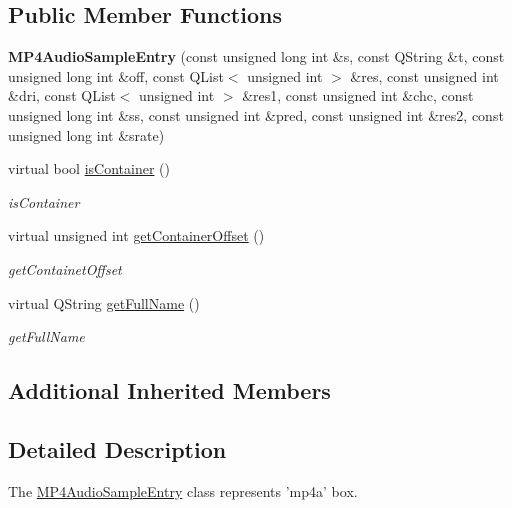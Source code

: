 \subsection*{Public Member Functions}
\begin{DoxyCompactItemize}
\item 
\hypertarget{class_m_p4_audio_sample_entry_a744193cef07d69037cd0b0ed7eb7feea}{{\bfseries M\-P4\-Audio\-Sample\-Entry} (const unsigned long int \&s, const Q\-String \&t, const unsigned long int \&off, const Q\-List$<$ unsigned int $>$ \&res, const unsigned int \&dri, const Q\-List$<$ unsigned int $>$ \&res1, const unsigned int \&chc, const unsigned long int \&ss, const unsigned int \&pred, const unsigned int \&res2, const unsigned long int \&srate)}\label{class_m_p4_audio_sample_entry_a744193cef07d69037cd0b0ed7eb7feea}

\item 
virtual bool \hyperlink{class_m_p4_audio_sample_entry_a17ffcfa7b17574ed19bd38ccab77f705}{is\-Container} ()
\begin{DoxyCompactList}\small\item\em is\-Container \end{DoxyCompactList}\item 
virtual unsigned int \hyperlink{class_m_p4_audio_sample_entry_a81c5345f7b14c1fc8fe089dae5fd5793}{get\-Container\-Offset} ()
\begin{DoxyCompactList}\small\item\em get\-Containet\-Offset \end{DoxyCompactList}\item 
virtual Q\-String \hyperlink{class_m_p4_audio_sample_entry_a81d787d905a0ee6fe1158daf8cddb64d}{get\-Full\-Name} ()
\begin{DoxyCompactList}\small\item\em get\-Full\-Name \end{DoxyCompactList}\end{DoxyCompactItemize}
\subsection*{Additional Inherited Members}


\subsection{Detailed Description}
The \hyperlink{class_m_p4_audio_sample_entry}{M\-P4\-Audio\-Sample\-Entry} class represents 'mp4a' box. 

